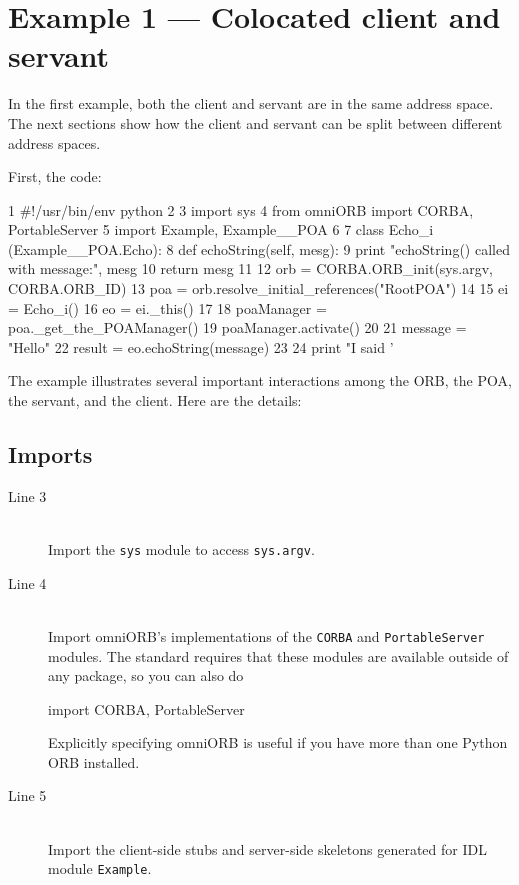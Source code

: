 \documentclass[11pt,oneside,a4paper]{book}
\newcommand{\module}[1]{\texttt{#1}}
\newcommand{\code}[1]{\texttt{#1}}
\begin{document}
\section{Example 1 --- Colocated client and servant}
\label{sec:eg1}

In the first example, both the client and servant are in the same
address space. The next sections show how the client and servant can
be split between different address spaces.

First, the code:

\lstset{numbers=left,gobble=4}
\begin{pylisting}
 1  #!/usr/bin/env python
 2  
 3  import sys
 4  from omniORB import CORBA, PortableServer
 5  import Example, Example__POA
 6  
 7  class Echo_i (Example__POA.Echo):
 8      def echoString(self, mesg):
 9          print "echoString() called with message:", mesg
10          return mesg
11  
12  orb = CORBA.ORB_init(sys.argv, CORBA.ORB_ID)
13  poa = orb.resolve_initial_references("RootPOA")
14  
15  ei = Echo_i()
16  eo = ei._this()
17  
18  poaManager = poa._get_the_POAManager()
19  poaManager.activate()
20  
21  message = "Hello"
22  result  = eo.echoString(message)
23
24  print "I said '%
\end{pylisting}
\lstset{numbers=none,gobble=0}

The example illustrates several important interactions among the ORB,
the POA, the servant, and the client. Here are the details:

\subsection{Imports}

\begin{description}

\item[Line 3]\mbox{}\\
%
Import the \module{sys} module to access \code{sys.argv}.

\item[Line 4]\mbox{}\\
%
Import omniORB's implementations of the \module{CORBA} and
\module{PortableServer} modules. The standard requires that these
modules are available outside of any package, so you can also do

\begin{pylisting}
import CORBA, PortableServer
\end{pylisting}

\noindent Explicitly specifying omniORB is useful if you have more
than one Python ORB installed.

\item[Line 5]\mbox{}\\
%
Import the client-side stubs and server-side skeletons generated for
IDL module \module{Example}.

\end{description}
\end{document}
